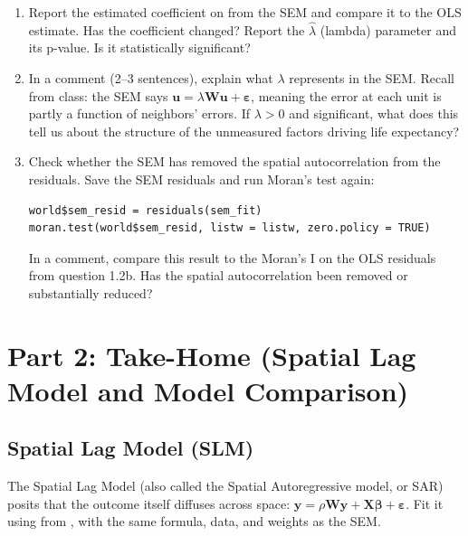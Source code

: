 \begin{enumerate}[label=\alph*)]

  \item Report the estimated coefficient on  from the SEM and compare it to the OLS estimate. Has the coefficient changed? Report the $\hat{\lambda}$ (lambda) parameter and its p-value. Is it statistically significant?

  \item In a comment (2--3 sentences), explain what $\lambda$ represents in the SEM. Recall from class: the SEM says $\mathbf{u} = \lambda \mathbf{W}\mathbf{u} + \boldsymbol{\varepsilon}$, meaning the error at each unit is partly a function of neighbors' errors. If $\lambda > 0$ and significant, what does this tell us about the structure of the unmeasured factors driving life expectancy?

  \item Check whether the SEM has removed the spatial autocorrelation from the residuals. Save the SEM residuals and run Moran's test again:
  \begin{lstlisting}
world$sem_resid = residuals(sem_fit)
moran.test(world$sem_resid, listw = listw, zero.policy = TRUE)
  \end{lstlisting}
  In a comment, compare this result to the Moran's I on the OLS residuals from question 1.2b. Has the spatial autocorrelation been removed or substantially reduced?

\end{enumerate}

\newpage

\section{Part 2: Take-Home (Spatial Lag Model and Model Comparison)}

\subsection{Spatial Lag Model (SLM)}

The Spatial Lag Model (also called the Spatial Autoregressive model, or SAR) posits that the outcome itself diffuses across space: $\mathbf{y} = \rho \mathbf{W}\mathbf{y} + \mathbf{X}\boldsymbol{\beta} + \boldsymbol{\varepsilon}$. Fit it using  from , with the same formula, data, and weights as the SEM.

